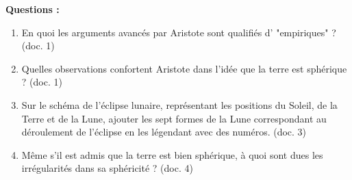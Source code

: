 \documentclass[a4paper,11pt,fleqn]{article}%
\begin{document}
\textbf{Questions :}
\begin{enumerate}
    \item En quoi les arguments avancés par Aristote sont qualifiés d' "empiriques" ? (doc. 1)
    \item Quelles observations confortent Aristote dans l'idée que la terre est sphérique ? (doc. 1)
    \item Sur le schéma de l'éclipse lunaire, représentant les positions du Soleil, de la Terre et de la Lune, ajouter les sept formes de la Lune correspondant au déroulement de l'éclipse en les légendant avec des numéros. (doc. 3)
    \item Même s'il est admis que la terre est bien sphérique, à quoi sont dues les irrégularités dans sa sphéricité ? (doc. 4)
\end{enumerate}
\end{document}
